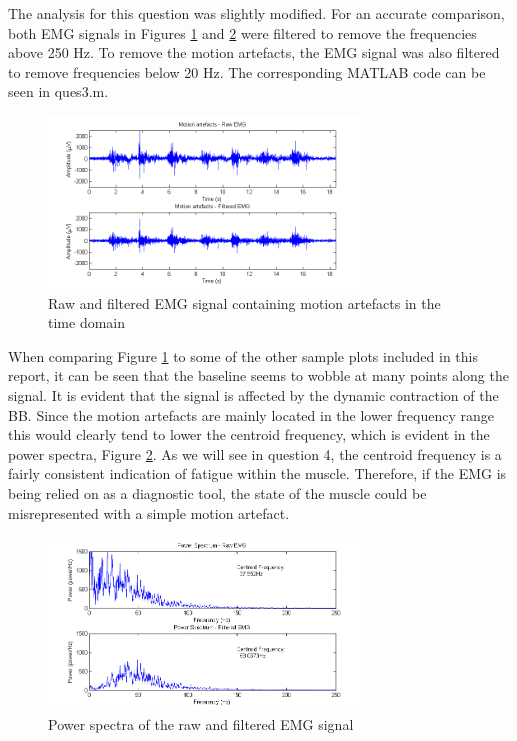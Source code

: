 \documentclass[11pt]{article}
\numberwithin{equation}{section}	%
\begin{document}
The analysis for this question was slightly modified. For an accurate comparison, both EMG signals in Figures \ref{fig3emg} and \ref{fig3spectrum} were filtered to remove the frequencies above 250 Hz. To remove the motion artefacts, the EMG signal was also filtered to remove frequencies below 20 Hz. The corresponding MATLAB code can be seen in ques3.m.

\begin{figure}[!ht]
  \centering
    \includegraphics[width=0.75\textwidth]{fig3emg}
	\caption{Raw and filtered EMG signal containing motion artefacts in the time domain}
	\label{fig3emg}
\end{figure}

When comparing Figure \ref{fig3emg} to some of the other sample plots included in this report, it can be seen that the baseline seems to wobble at many points along the signal. It is evident that the signal is affected by the dynamic contraction of the BB. Since the motion artefacts are mainly located in the lower frequency range this would clearly tend to lower the centroid frequency, which is evident in the power spectra, Figure \ref{fig3spectrum}. As we will see in question 4, the centroid frequency is a fairly consistent indication of fatigue within the muscle. Therefore, if the EMG is being relied on as a diagnostic tool, the state of the muscle could be misrepresented with a simple motion artefact.

\begin{figure}[!ht]
  \centering
    \includegraphics[width=0.75\textwidth]{fig3spectrum}
	\caption{Power spectra of the raw and filtered EMG signal}
	\label{fig3spectrum}
\end{figure}
\end{document}
